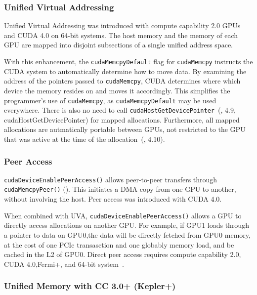 \subsubsection{Unified Virtual Addressing}

Unified Virtual Addressing was introduced with compute capability 2.0 GPUs  and CUDA 4.0 on 64-bit systems.
The host memory and the memory of each GPU are mapped into disjoint subsections of a single unified address space.

With this enhancement, the \texttt{cudaMemcpyDefault} flag for \texttt{cudaMemcpy} instructs the CUDA system to automatically determine how to move data.
By examining the address of the pointers passed to \texttt{cudaMemcpy}, CUDA determines where which device the memory resides on and moves it accordingly.
This simplifies the programmer's use of \texttt{cudaMemcpy}, as \texttt{cudaMemcpyDefault} may be used everywhere.
There is also no need to call \texttt{cudaHostGetDevicePointer}~(\cite{nvidia2018cuda}, 4.9, cudaHostGetDevicePointer) for mapped allocations.
Furthermore, all mapped allocations are autmatically portable between GPUs, not restricted to the GPU that was active at the time of the allocation~(\cite{nvidia2018cuda}, 4.10).

\subsubsection{Peer Access}

\texttt{cudaDeviceEnablePeerAccess()} allows peer-to-peer transfers through \texttt{cudaMemcpyPeer()} ().
This initiates a DMA copy from one GPU to another, without involving the host.
Peer access was introduced with CUDA 4.0.

When combined with UVA, \texttt{cudaDeviceEnablePeerAccess()} allows a GPU to directly access allocations on another GPU.
For example, if GPU1 loads through a pointer to data on GPU0,the data will be directly fetched from GPU0 memory, at the cost of one PCIe transasction and one globably memory load, and be cached in the L2 of GPU0.
Direct peer access requires compute capability 2.0, CUDA 4.0,Fermi+, and 64-bit system~\cite{schroeder2011peer}.

\subsubsection{Unified Memory with CC 3.0+ (Kepler+)}


